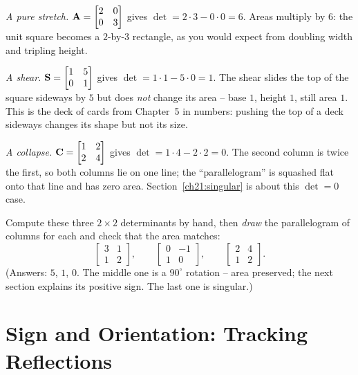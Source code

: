 \begin{example}
\label{ch21:ex-three-2x2}
\emph{A pure stretch.}
$\mathbf{A} = \begin{bmatrix} 2 & 0 \\ 0 & 3 \end{bmatrix}$ gives
$\det = 2\cdot 3 - 0\cdot 0 = 6$. Areas multiply by $6$: the unit square becomes a
$2$-by-$3$ rectangle, as you would expect from doubling width and tripling height.

\emph{A shear.}
$\mathbf{S} = \begin{bmatrix} 1 & 5 \\ 0 & 1 \end{bmatrix}$ gives
$\det = 1\cdot 1 - 5\cdot 0 = 1$. The shear slides the top of the square sideways
by $5$ but does \emph{not} change its area -- base $1$, height $1$, still area $1$.
This is the deck of cards from Chapter~5 in numbers: pushing the top of a deck
sideways changes its shape but not its size.

\emph{A collapse.}
$\mathbf{C} = \begin{bmatrix} 1 & 2 \\ 2 & 4 \end{bmatrix}$ gives
$\det = 1\cdot 4 - 2\cdot 2 = 0$. The second column is twice the first, so both
columns lie on one line; the ``parallelogram'' is squashed flat onto that line and
has zero area. Section~\ref{ch21:singular} is about this $\det = 0$ case.
\end{example}

\begin{labbox}
Compute these three $2\times 2$ determinants by hand, then \emph{draw} the
parallelogram of columns for each and check that the area matches:
\[
  \begin{bmatrix} 3 & 1 \\ 1 & 2 \end{bmatrix},\qquad
  \begin{bmatrix} 0 & -1 \\ 1 & 0 \end{bmatrix},\qquad
  \begin{bmatrix} 2 & 4 \\ 1 & 2 \end{bmatrix}.
\]
(Answers: $5$, $1$, $0$. The middle one is a $90^\circ$ rotation -- area
preserved; the next section explains its positive sign. The last one
is singular.)
\end{labbox}

\section{Sign and Orientation: Tracking Reflections}
\label{ch21:sign}

